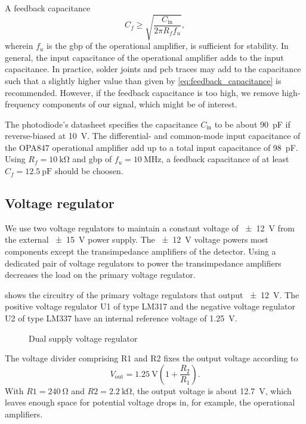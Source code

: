 A feedback capacitance
\begin{equation}
	C_f\geq\sqrt{\frac{C_\text{in}}{2\pi R_f f_u}},
	\label{eq:feedback_capacitance}
\end{equation}
wherein $f_u$ is the \gls{gbp} of the operational amplifier,
 is sufficient for stability.
 In general, the input capacitance of the operational amplifier adds to the input capacitance.
 In practice, solder joints and \gls{pcb} traces may add to the capacitance such that a slightly higher value than given by \cref{eq:feedback_capacitance} is recommended.
 However, if the feedback capacitance is too high, we remove high-frequency components of our signal, which might be of interest.
 
The photodiode's datasheet specifies the capacitance $C_\text{in}$ to be about \SI{90}{\pico\farad} if reverse-biased at \SI{10}{\volt}.
The differential- and common-mode input capacitance of the OPA847 operational amplifier add up to a total input capacitance of \SI{98}{\pico\farad}.
Using $R_f=\SI{10}{\kilo\ohm}$ and \gls{gbp} of $f_u=\SI{10}{\mega\hertz}$, a feedback capacitance of at least $C_f=\SI{12.5}{\pico\farad}$ should be choosen.

\subsection{Voltage regulator}

We use two voltage regulators to maintain a constant voltage of \SI{\pm12}{\volt} from the external \SI{\pm15}{\volt} power supply. The \SI{\pm12}{\volt} voltage powers most components except the transimpedance amplifiers of the detector.
Using a dedicated pair of voltage regulators to power the transimpedance amplifiers decreases the load on the primary voltage regulator.

 shows the circuitry of the primary voltage regulators that output \SI{\pm12}{\volt}.
The positive voltage regulator U1 of type LM317 and the negative voltage regulator U2 of type LM337 have an internal reference voltage of \SI{1.25}{\volt}.

\begin{figure}[H]
	\centering
	
	\caption{Dual supply voltage regulator}\label{fig:voltage_regulator}
\end{figure}

The voltage divider comprising R1 and R2 fixes the output voltage according to
\begin{equation}
	V_\text{out}=\SI{1.25}{\volt}\left(1+\frac{R_2}{R_1}\right).
\end{equation}
With $R1 = \SI{240}{\ohm}$ and $R2 = \SI{2.2}{\kilo\ohm}$, the output voltage is about \SI{12.7}{\volt}, which leaves enough space for potential voltage drops in, for example, the operational amplifiers.

